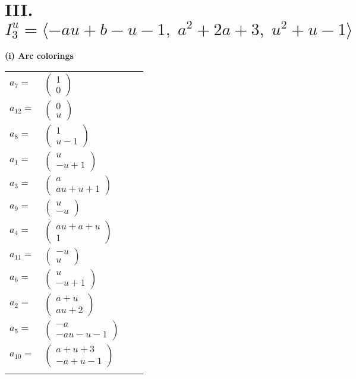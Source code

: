 \documentclass[1p]{elsarticle_modified}
\theoremstyle{definition}
\begin{document}
\centering \section*{III. $I^u_{3}= \langle - a u+b- u-1,\;a^2+2 a+3,\;u^2+u-1 \rangle$}
\flushleft \textbf{(i) Arc colorings}\\
\begin{tabular}{m{7pt} m{180pt} m{7pt} m{180pt} }
\flushright $a_{7}=$&$\begin{pmatrix}1\\0\end{pmatrix}$ \\
\flushright $a_{12}=$&$\begin{pmatrix}0\\u\end{pmatrix}$ \\
\flushright $a_{8}=$&$\begin{pmatrix}1\\u-1\end{pmatrix}$ \\
\flushright $a_{1}=$&$\begin{pmatrix}u\\- u+1\end{pmatrix}$ \\
\flushright $a_{3}=$&$\begin{pmatrix}a\\a u+u+1\end{pmatrix}$ \\
\flushright $a_{9}=$&$\begin{pmatrix}u\\- u\end{pmatrix}$ \\
\flushright $a_{4}=$&$\begin{pmatrix}a u+a+u\\1\end{pmatrix}$ \\
\flushright $a_{11}=$&$\begin{pmatrix}- u\\u\end{pmatrix}$ \\
\flushright $a_{6}=$&$\begin{pmatrix}u\\- u+1\end{pmatrix}$ \\
\flushright $a_{2}=$&$\begin{pmatrix}a+u\\a u+2\end{pmatrix}$ \\
\flushright $a_{5}=$&$\begin{pmatrix}- a\\- a u- u-1\end{pmatrix}$ \\
\flushright $a_{10}=$&$\begin{pmatrix}a+u+3\\- a+u-1\end{pmatrix}$\\&\end{tabular}
\end{document}
